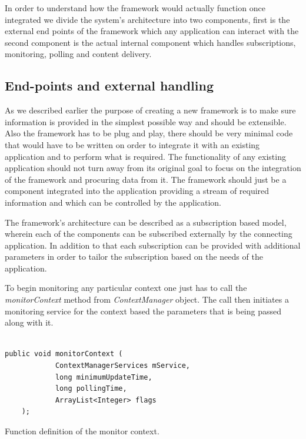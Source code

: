 \documentclass[12pt]{report}
\begin{document}
In order to understand how the framework would actually function once integrated we divide the system's architecture into two components, first is the external end points of the framework which any application can interact with the second component is the actual internal component which handles subscriptions, monitoring, polling and content delivery.

\subsection{End-points and external handling}
\label{ExternalHandling}

As we described earlier the purpose of creating a new framework is to make sure information is provided in the simplest possible way and should be extensible. Also the framework has to be plug and play, there should be very minimal code that would have to be written on order to integrate it with an existing application and to perform what is required. The functionality of any existing application should not turn away from its original goal to focus on the integration of the framework and procuring data from it. The framework should just be a component integrated into the application providing a stream of required information and which can be controlled by the application.

The framework's architecture can be described as a subscription based model, wherein each of the components can be subscribed externally by the connecting application. In addition to that each subscription can be provided with additional parameters in order to tailor the subscription based on the needs of the application.

To begin monitoring any particular context one just has to call the \textit{monitorContext} method from \textit{ContextManager} object. The call then initiates a monitoring service for the context based the parameters that is being passed along with it.

\begin{program}
  \begin{verbatim}

public void monitorContext (
            ContextManagerServices mService,
            long minimumUpdateTime,
            long pollingTime,
            ArrayList<Integer> flags
    );
\end{verbatim}
\label{monitorContextCall}
\caption{Function definition of the monitor context.}
\end{program}
\end{document}

